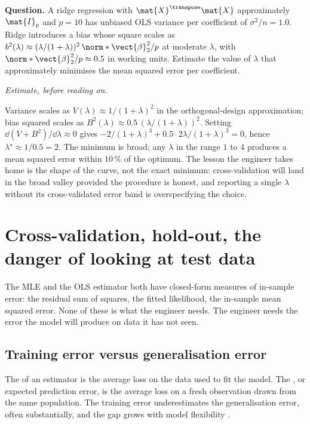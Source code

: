 \begin{estimation}
\textbf{Question.} A ridge regression with
$\mat{X}^{\transpose}\mat{X}$ approximately $\mat{I}_{p}$ and
$p = 10$ has unbiased OLS variance per coefficient of
$\sigma^{2}/n = 1.0$. Ridge introduces a bias whose square scales
as $b^{2}(\lambda) \approx (\lambda/(1+\lambda))^{2}\,
\norm*{\vect{\beta}}_{2}^{2}/p$ at moderate $\lambda$, with
$\norm*{\vect{\beta}}_{2}^{2}/p \approx 0.5$ in working units.
Estimate the value of $\lambda$ that approximately minimises the
mean squared error per coefficient.

\smallskip
\textit{Estimate, before reading on.}

\smallskip
Variance scales as $V(\lambda) \approx 1/(1+\lambda)^{2}$ in the
orthogonal-design approximation; bias squared scales as
$B^{2}(\lambda) \approx 0.5\,(\lambda/(1+\lambda))^{2}$. Setting
$\dd(V + B^{2})/\dd\lambda \approx 0$ gives $-2/(1+\lambda)^{3} +
0.5 \cdot 2\lambda/(1+\lambda)^{3} = 0$, hence $\lambda^{\star}
\approx 1/0.5 = 2$. The minimum is broad; any $\lambda$ in the
range $1$ to $4$ produces a mean squared error within $10\,\%$ of
the optimum. The lesson the engineer takes home is the shape of
the curve, not the exact minimum: cross-validation will land in
the broad valley provided the procedure is honest, and reporting
a single $\lambda$ without its cross-validated error band is
overspecifying the choice.
\end{estimation}

\section{Cross-validation, hold-out, the danger of looking at test data}

The MLE and the OLS estimator both have closed-form measures of
in-sample error: the residual sum of squares, the fitted likelihood,
the in-sample mean squared error. None of these is what the
engineer needs. The engineer needs the error the model will produce
on data it has not seen.

\subsection{Training error versus generalisation error}

The  of an estimator is the average loss on
the data used to fit the model. The ,
or expected prediction error, is the average loss on a fresh
observation drawn from the same population. The training error
underestimates the generalisation error, often substantially, and
the gap grows with model flexibility \cite[ch.~21]{text:wasserman2004}.

